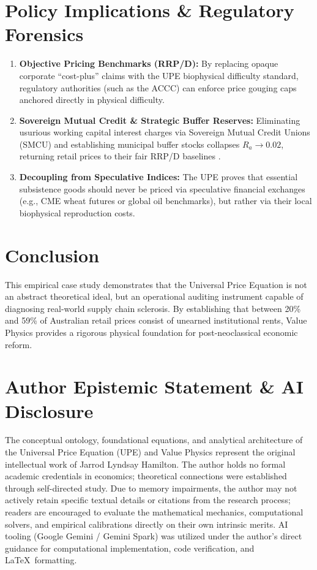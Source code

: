 \documentclass[preprint,12pt,authoryear]{elsarticle}
\begin{document}
\section{Policy Implications \& Regulatory Forensics}
\begin{enumerate}
    \item \textbf{Objective Pricing Benchmarks (RRP/D):} By replacing opaque corporate ``cost-plus'' claims with the UPE biophysical difficulty standard, regulatory authorities (such as the ACCC) can enforce price gouging caps anchored directly in physical difficulty.
    \item \textbf{Sovereign Mutual Credit \& Strategic Buffer Reserves:} Eliminating usurious working capital interest charges via Sovereign Mutual Credit Unions (SMCU) and establishing municipal buffer stocks collapses $R_a \to 0.02$, returning retail prices to their fair RRP/D baselines \citep{godley2007monetary, hamilton2026vpe49}.
    \item \textbf{Decoupling from Speculative Indices:} The UPE proves that essential subsistence goods should never be priced via speculative financial exchanges (e.g., CME wheat futures or global oil benchmarks), but rather via their local biophysical reproduction costs.
\end{enumerate}

\section{Conclusion}
This empirical case study demonstrates that the Universal Price Equation is not an abstract theoretical ideal, but an operational auditing instrument capable of diagnosing real-world supply chain sclerosis. By establishing that between 20\% and 59\% of Australian retail prices consist of unearned institutional rents, Value Physics provides a rigorous physical foundation for post-neoclassical economic reform.

\section*{Author Epistemic Statement \& AI Disclosure}
The conceptual ontology, foundational equations, and analytical architecture of the Universal Price Equation (UPE) and Value Physics represent the original intellectual work of Jarrod Lyndsay Hamilton. The author holds no formal academic credentials in economics; theoretical connections were established through self-directed study. Due to memory impairments, the author may not actively retain specific textual details or citations from the research process; readers are encouraged to evaluate the mathematical mechanics, computational solvers, and empirical calibrations directly on their own intrinsic merits. AI tooling (Google Gemini / Gemini Spark) was utilized under the author's direct guidance for computational implementation, code verification, and \LaTeX\ formatting.
\end{document}
